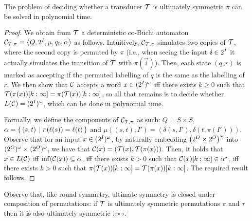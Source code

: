 \begin{theorem}
	The problem of deciding whether a transducer $\mathcal{T}$ is ultimately symmetric \WRT $\pi$ can be solved in polynomial time.
\end{theorem}
\begin{proof}
	We obtain from $\mathcal{T}$ a deterministic co-B\"uchi automaton $\mathcal{C}_{\mathcal{T},\pi}=\left< Q,2^{I},\mu,q_0,\alpha\right>$ as follows. Intuitively, $\mathcal{C}_{\mathcal{T},\pi}$ simulates two copies of $\mathcal{T}$, where the second copy is permuted by $\pi$ (i.e., when seeing the input $\boldsymbol{i}\in 2^{I}$ it actually simulates the transition of $\mathcal{T}$ with $\pi(\vec{i})$). Then, each state $(q,r)$ is marked as accepting if the permuted labelling of $q$ is the same as the labelling of $r$. 
	We then show that $\mathcal{C}$ accepts a word $x\in (2^{I})^\omega$ iff there exists $k\ge 0$ such that $\mathcal{T}(\pi(x))[k:\infty]=\pi(\mathcal{T}(x))[k:\infty]$, so all that remains is to decide whether $L(\mathcal{C})=(2^{I})^\omega$, which can be done in polynomial time.
	
	Formally, we define the components of $\mathcal{C}_{\mathcal{T}, \pi}$ as such: $Q=S\times S$, $\alpha=\left\{\,(s,t)\ \middle|\ \pi(\ell(s))=\ell(t)\,\right\}$ and $\mu\left((s,t),I'\right)=\left( \delta(s,I'), \delta(t, \pi(I')) \right)$. Observe that for an input $x\in (2^{I})^\omega$, by naturally embedding $\left(2^{O} \times 2^{O}\right)^\omega$ into $(2^{O})^\omega\times (2^{O})^\omega$, we have that $\mathcal{C}(x)=\left(\mathcal{T}(x), \mathcal{T}(\pi(x))\right)$.
	Then, it holds that $x\in L(\mathcal{C})$ iff $\inf(\mathcal{C}(x))\subseteq \alpha$, iff there exists $k>0$ such that $\mathcal{C}(x)[k:\infty]\in \alpha^\star$, iff there exists $k>0$ such that $\pi(\mathcal{T}(x))[k:\infty]=\mathcal{T}(\pi(x))[k:\infty]$. The required result follows.
\end{proof}

Observe that, like round symmetry, ultimate symmetry is closed under composition of permutations: if $\mathcal{T}$ is ultimately symmetric \WRT permutations $\pi$ and $\tau$ then it is also ultimately symmetric \WRT $\pi\circ\tau$.
